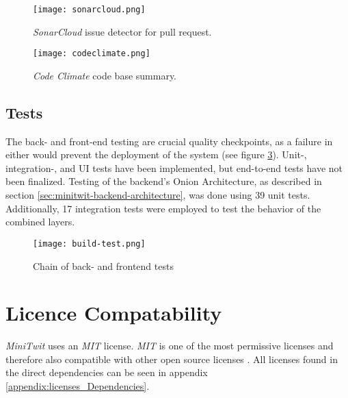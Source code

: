 \begin{figure}[H]
    \centering
    \texttt{[image: sonarcloud.png]}
    \caption{\textit{SonarCloud} issue detector for pull request.}
    \label{fig:sonarcloud}
\end{figure}

\begin{figure}[H]
    \centering
    \texttt{[image: codeclimate.png]}
    \caption{\textit{Code Climate} code base summary.}
    \label{fig:codeclimate}
\end{figure}

\subsection{Tests}

The back- and front-end testing are crucial quality checkpoints, as a failure in either would prevent the deployment of the system (see figure \ref{fig:tests}). Unit-, integration-, and UI tests have been implemented, but end-to-end tests have not been finalized. Testing of the backend's Onion Architecture, as described in section \ref{sec:minitwit-backend-architecture}, was done using 39 unit tests. Additionally, 17 integration tests were employed to test the behavior of the combined layers.

\begin{figure}[H]
    \centering
    \texttt{[image: build-test.png]}
    \caption{Chain of back- and frontend tests}
    \label{fig:tests}
\end{figure}

\section{Licence Compatability}

\textit{MiniTwit} uses an \textit{MIT} license. \textit{MIT} is one of the most permissive licenses and therefore also compatible with other open source licenses \cite{wheeler:floss-license-slide}. All licenses found in the direct dependencies can be seen in appendix \ref{appendix:licenses_Dependencies}. 